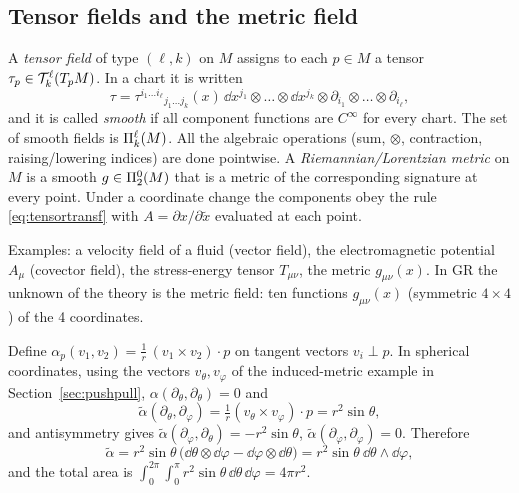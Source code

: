 \subsection{Tensor fields and the metric field}\label{sec:tensorfields}
\begin{formal}
A \emph{tensor field} of type $(\ell,k)$ on $M$ assigns to each $p\in M$ a tensor $\tau_p\in\mathcal{T}^{\ell}_{k}(T_pM)$. In a chart it is written
\[
\tau=\tau^{i_1\dots i_\ell}{}_{j_1\dots j_k}(x)\,\dd x^{j_1}\otimes\dots\otimes\dd x^{j_k}\otimes\partial_{i_1}\otimes\dots\otimes\partial_{i_\ell},
\]
and it is called \emph{smooth} if all component functions are $C^\infty$ for every chart. The set of smooth fields is $\Pi^{\ell}_{k}(M)$. All the algebraic operations (sum, $\otimes$, contraction, raising/lowering indices) are done pointwise. A \emph{Riemannian/Lorentzian metric} on $M$ is a smooth $g\in\Pi^{0}_{2}(M)$ that is a metric of the corresponding signature at every point. Under a coordinate change the components obey the rule \eqref{eq:tensortransf} with $A=\partial x/\partial\tilde x$ evaluated at each point.
\end{formal}
\begin{intuition}[{a field = a tensor at every point, varying smoothly}]
Examples: a velocity field of a fluid (vector field), the electromagnetic potential $A_\mu$ (covector field), the stress-energy tensor $T_{\mu\nu}$, the metric $g_{\mu\nu}(x)$. In GR the unknown of the theory is the metric field: ten functions $g_{\mu\nu}(x)$ (symmetric $4\times4$) of the 4 coordinates.
\end{intuition}

\begin{example}\label{ex:sphereareaform}
Define $\alpha_p(v_1,v_2)=\frac1r\,(v_1\times v_2)\cdot p$ on tangent vectors $v_i\perp p$. In spherical coordinates, using the vectors $v_\theta,v_\varphi$ of the induced-metric example in Section~\ref{sec:pushpull}, $\alpha(\partial_\theta,\partial_\theta)=0$ and
\[
\tilde\alpha(\partial_\theta,\partial_\varphi)=\tfrac1r(v_\theta\times v_\varphi)\cdot p=r^2\sin\theta,
\]
and antisymmetry gives $\tilde\alpha(\partial_\varphi,\partial_\theta)=-r^2\sin\theta$, $\tilde\alpha(\partial_\varphi,\partial_\varphi)=0$. Therefore
\[
\tilde\alpha=r^2\sin\theta\,\big(\dd\theta\otimes\dd\varphi-\dd\varphi\otimes\dd\theta\big)=r^2\sin\theta\ \dd\theta\wedge\dd\varphi,
\]
and the total area is $\int_0^{2\pi}\!\!\int_0^\pi r^2\sin\theta\,\dd\theta\,\dd\varphi=4\pi r^2$. \checkmark
\end{example}

